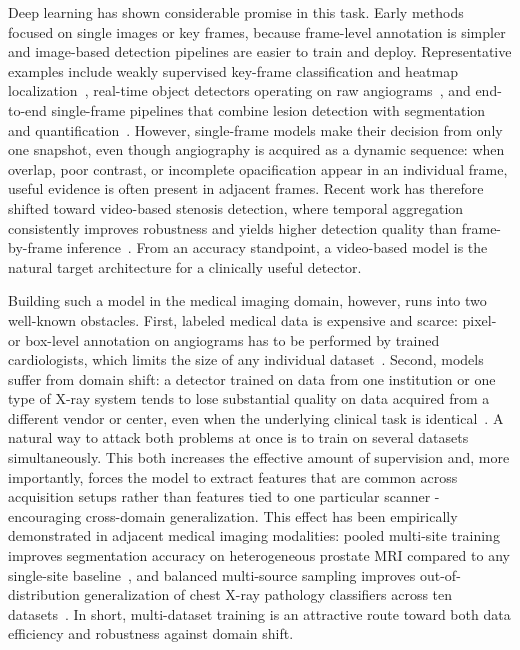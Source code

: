 \documentclass[conference]{IEEEtran}
\begin{document}
Deep learning has shown considerable promise in this task. Early methods focused on single images or key frames, because frame-level annotation is simpler and image-based detection pipelines are easier to train and deploy. Representative examples include weakly supervised key-frame classification and heatmap localization~\cite{MOON2021105819}, real-time object detectors operating on raw angiograms~\cite{Danilov2021, attentionstenosis, kupeli2025yolo}, and end-to-end single-frame pipelines that combine lesion detection with segmentation and quantification~\cite{aipoweredrealtime, choudhary2026odysseiopensourceendtoendframework}. However, single-frame models make their decision from only one snapshot, even though angiography is acquired as a dynamic sequence: when overlap, poor contrast, or incomplete opacification appear in an individual frame, useful evidence is often present in adjacent frames. Recent work has therefore shifted toward video-based stenosis detection, where temporal aggregation consistently improves robustness and yields higher detection quality than frame-by-frame inference~\cite{fvcm, PANG2021101900, HAN2023106546, STQD-Det, li2025ltyolo}. From an accuracy standpoint, a video-based model is the natural target architecture for a clinically useful detector.

Building such a model in the medical imaging domain, however, runs into two well-known obstacles. First, labeled medical data is expensive and scarce: pixel- or box-level annotation on angiograms has to be performed by trained cardiologists, which limits the size of any individual dataset~\cite{huang2026vasomim}. Second, models suffer from domain shift: a detector trained on data from one institution or one type of X-ray system tends to lose substantial quality on data acquired from a different vendor or center, even when the underlying clinical task is identical~\cite{cardiovascular, popov2022reviewmodernapproachescoronary}. A natural way to attack both problems at once is to train on several datasets simultaneously. This both increases the effective amount of supervision and, more importantly, forces the model to extract features that are common across acquisition setups rather than features tied to one particular scanner - encouraging cross-domain generalization. This effect has been empirically demonstrated in adjacent medical imaging modalities: pooled multi-site training improves segmentation accuracy on heterogeneous prostate MRI compared to any single-site baseline~\cite{liu2020msnet}, and balanced multi-source sampling improves out-of-distribution generalization of chest X-ray pathology classifiers across ten datasets~\cite{tetteh2021multidomain}. In short, multi-dataset training is an attractive route toward both data efficiency and robustness against domain shift.
\end{document}

